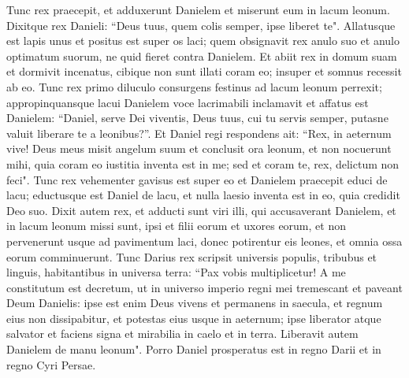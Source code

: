 \begin{biblechapter}
\verse Tunc rex praecepit, et adduxerunt Danielem et miserunt eum in lacum leonum. Dixitque rex Danieli: “Deus tuus, quem colis semper, ipse liberet te". 
\verse Allatusque est lapis unus et positus est super os laci; quem obsignavit rex anulo suo et anulo optimatum suorum, ne quid fieret contra Danielem. 
\verse Et abiit rex in domum suam et dormivit incenatus, cibique non sunt illati coram eo; insuper et somnus recessit ab eo. 
\verse Tunc rex primo diluculo consurgens festinus ad lacum leonum perrexit; 
\verse appropinquansque lacui Danielem voce lacrimabili inclamavit et affatus est Danielem: “Daniel, serve Dei viventis, Deus tuus, cui tu servis semper, putasne valuit liberare te a leonibus?”. 
\verse Et Daniel regi respondens ait: “Rex, in aeternum vive!  
\verse Deus meus misit angelum suum et conclusit ora leonum, et non nocuerunt mihi, quia coram eo iustitia inventa est in me; sed et coram te, rex, delictum non feci". 
\verse Tunc rex vehementer gavisus est super eo et Danielem praecepit educi de lacu; eductusque est Daniel de lacu, et nulla laesio inventa est in eo, quia credidit Deo suo. 
\verse Dixit autem rex, et adducti sunt viri illi, qui accusaverant Danielem, et in lacum leonum missi sunt, ipsi et filii eorum et uxores eorum, et non pervenerunt usque ad pavimentum laci, donec potirentur eis leones, et omnia ossa eorum comminuerunt. 
\verse Tunc Darius rex scripsit universis populis, tribubus et linguis, habitantibus in universa terra: “Pax vobis multiplicetur! 
\verse A me constitutum est decretum, ut in universo imperio regni mei tremescant et paveant Deum Danielis: ipse est enim Deus vivens et permanens in saecula, et regnum eius non dissipabitur, et potestas eius usque in aeternum; 
\verse ipse liberator atque salvator et faciens signa et mirabilia in caelo et in terra. Liberavit autem Danielem de manu leonum". 
\verse Porro Daniel prosperatus est in regno Darii et in regno Cyri Persae. 
\end{biblechapter}

